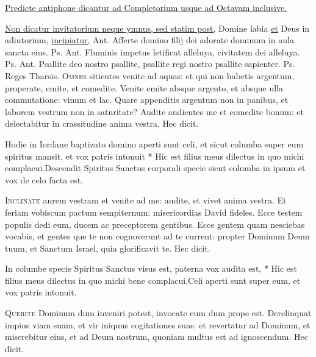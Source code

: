 \begin{multicols*}{2}
\newline \ul{Predicte antiphone dicantur ad Completorium usque ad Octavam inclusive.}
{\color{Red} }
\par \noindent \ul{Non dicatur invitatorium neque ymnus, sed statim post,} Domine labia \ul{et} Deus in adiutorium, \ul{incipiatur,} {\color{Red} Ant.} Afferte domino filij dei adorate dominum in aula sancta eius. {\color{Red} Ps.}  {\color{Red} Ant.} Fluminis impetus letificat alleluya, civitatem dei alleluya. {\color{Red} Ps.}  {\color{Red} Ant.} Psallite deo nostro psallite, psallite regi nostro psallite sapienter. {\color{Red} Ps.}  \V Reges Tharsis.
\lettrine[lines=2]{\zallmancaps \color{Red} O}{mnes} sitientes venite ad aquas: et qui non habetis argentum, properate, emite, et comedite. Venite emite absque argento, et absque ulla commutatione: vinum et lac. Quare appenditis argentum non in panibus, et laborem vestrum non in saturitate? Audite audientes me et comedite bonum: et delectabitur in crassitudine anima vestra. Hec dicit.
\begin{responsory}
{Hodie in Iordane baptizato domino aperti sunt celi, et sicut columba super eum spiritus mansit, et vox patris intonuit * Hic est filius meus dilectus in quo michi complacui.}{Descendit Spiritus Sanctus corporali specie sicut columba in ipsum et vox de celo facta est.}
\end{responsory}
\lettrine[lines=2]{\zallmancaps \color{Blue} I}{nclinate} aurem vestram et venite ad me: audite, et vivet anima vestra. Et feriam vobiscum pactum sempiternum: misericordias David fideles. Ecce testem populis dedi eum, ducem ac preceptorem gentibus. Ecce gentem quam nesciebas vocabis, et gentes que te non cognoverunt ad te current: propter Dominum Deum tuum, et Sanctum Israel, quia glorificavit te. Hec dicit.
\begin{responsory}[in-columbe]
{In columbe specie Spiritus Sanctus visus est, paterna vox audita est, * Hic est filius meus dilectus in quo michi bene complacui.}{Celi aperti sunt super eum, et vox patris intonuit.}
\end{responsory}
\lettrine[lines=2]{\zallmancaps \color{Red} Q}{uerite} Dominum dum inveniri potest, invocate eum dum prope est. Derelinquat impius viam suam, et vir iniquus cogitationes suas: et revertatur ad Dominum, et miserebitur eius, et ad Deum nostrum, quoniam multus est ad ignoscendum. Hec dicit.

\end{multicols*}
